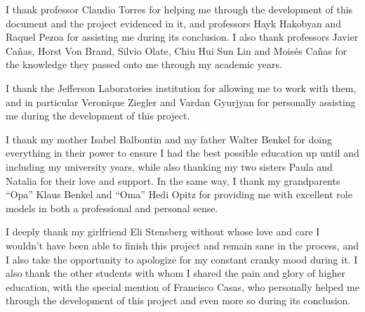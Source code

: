 \begin{center}
\end{center}

\noindent
I thank professor Claudio Torres for helping me through the development of this document and the project evidenced in it, and professors Hayk Hakobyan and Raquel Pezoa for assisting me during its conclusion.
I also thank professors Javier Ca\~nas, Horst Von Brand, Silvio Olate, Chiu Hui Sun Lin and Mois\'es Ca\~nas for the knowledge they passed onto me through my academic years.

I thank the Jefferson Laboratories institution for allowing me to work with them, and in particular Veronique Ziegler and Vardan Gyurjyan for personally assisting me during the development of this project.

I thank my mother Isabel Balbontin and my father Walter Benkel for doing everything in their power to ensure I had the best possible education up until and including my university years, while also thanking my two sisters Paula and Natalia for their love and support.
In the same way, I thank my grandparents ``Opa'' Klaus Benkel and ``Oma'' Hedi Opitz for providing me with excellent role models in both a professional and personal sense.

I deeply thank my girlfriend Eli Stensberg without whose love and care I wouldn't have been able to finish this project and remain sane in the process, and I also take the opportunity to apologize for my constant cranky mood during it.
I also thank the other students with whom I shared the pain and glory of higher education, with the special mention of Francisco Casas, who personally helped me through the development of this project and even more so during its conclusion.
\vfill